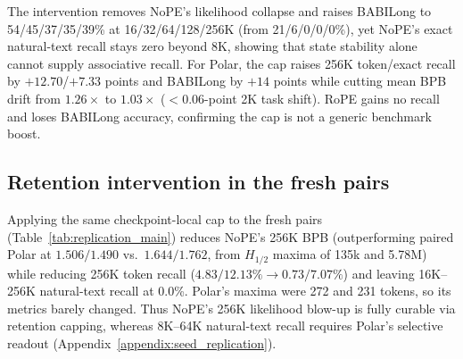 \documentclass{article}
\newcommand{\rev}[1]{{\color{revcolor}#1}}
\begin{document}
\begin{table}[!ht]
\centering
\small
\setlength{\tabcolsep}{2.6pt}
\caption{Inference-only retention diagnostic. Results show archived baseline $\rightarrow$ one-head 256-token half-life cap. Base mean averages eight 2K tasks (\%). Retrieval is token/exact accuracy (\%), BABI is macro exact match, and BPB averages three fixed-target datasets. The cap is a probe, not a proposed trained model.}
\label{tab:gamma_rebench}
\end{table}

The intervention removes NoPE's likelihood collapse and raises BABILong to 54/45/37/35/39\% at 16/32/64/128/256K (from 21/6/0/0/0\%), yet NoPE's exact natural-text recall stays zero beyond 8K, showing that state stability alone cannot supply associative recall. For Polar, the cap raises 256K token/exact recall by $+12.70$/$+7.33$ points and BABILong by $+14$ points while cutting mean BPB drift from $1.26\times$ to $1.03\times$ ($<0.06$-point 2K task shift). RoPE gains no recall and loses BABILong accuracy, confirming the cap is not a generic benchmark boost.

\subsection{Retention intervention in the fresh pairs}
Applying the same checkpoint-local cap to the fresh pairs (Table~\ref{tab:replication_main}) \rev{reduces NoPE's 256K BPB (outperforming paired Polar at $1.506/1.490$ vs.\ $1.644/1.762$, from $H_{1/2}$ maxima of 135k and 5.78M) while reducing 256K token recall ($4.83/12.13\%\rightarrow0.73/7.07\%$) and leaving 16K--256K natural-text recall at 0.0\%.} Polar's maxima were 272 and 231 tokens, so its metrics barely changed. \rev{Thus NoPE's 256K likelihood blow-up is fully curable via retention capping, whereas 8K--64K natural-text recall requires Polar's selective readout} (Appendix~\ref{appendix:seed_replication}).
\end{document}
